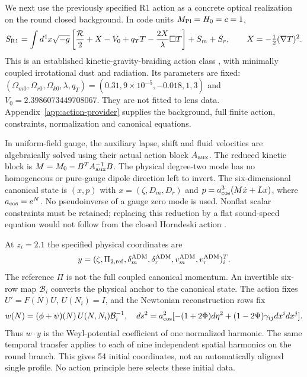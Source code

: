 \documentclass[11pt,a4paper]{article}
\begin{document}
We next use the previously specified R1 action as a concrete optical
realization on the round closed background. In code units
$M_{\rm Pl}=H_0=c=1$,
\begin{equation}
 S_{\rm R1}=\int d^4x\sqrt{-g}\left[
 \frac{\mathcal R}{2}+X-V_0+q_TT-\frac{2X}{\lambda}\Box T\right]+S_m+S_r,
 \qquad X=-\tfrac12(\nabla T)^2.
 \label{eq:r1}
\end{equation}
This is an established kinetic-gravity-braiding action class
\cite{Deffayet2010Braiding,Kobayashi2011Generalized}, with minimally
coupled irrotational dust and radiation. Its parameters are fixed:
$(\Omega_{m0},\Omega_{r0},\Omega_{k0},\lambda,q_T)
=(0.31,9\times10^{-5},-0.018,1,3)$ and
$V_0=2.3986073449708067$. They are not fitted to lens data.
Appendix~\ref{app:action-provider} supplies the background, full finite
action, constraints, normalization and canonical equations.

In uniform-field gauge, the auxiliary lapse, shift and fluid velocities
are algebraically solved using their actual action block $A_{\rm aux}$.
The reduced kinetic block is $M=M_0-B^TA_{\rm aux}^{-1}B$.
The physical degree-two mode has no homogeneous or pure-gauge dipole
direction left to invert. The six-dimensional canonical state is
$(x,p)$ with $x=(\zeta,D_m,D_r)$ and
$p=a_{\rm cos}^3(M\dot x+Lx)$, where $a_{\rm cos}=e^N$.
No pseudoinverse of a gauge zero mode is used. Nonflat scalar constraints
must be retained; replacing this reduction by a flat sound-speed equation
would not follow from the closed Horndeski action \cite{Akama2019Nonflat}.

At $z_i=2.1$ the specified physical coordinates are
\begin{equation}
 y=(\zeta,\Pi_{2,\rm ref},\delta_m^{\rm ADM},\delta_r^{\rm ADM},
 v_m^{\rm ADM},v_r^{\rm ADM})_i^T.
 \label{eq:anchor}
\end{equation}
The reference $\Pi$ is not the full coupled canonical momentum.
An invertible six-row map $\mathcal B_i$ converts the physical anchor
to the canonical state. The action fixes $U'=F(N)U$, $U(N_i)=I$,
and the Newtonian reconstruction rows fix
\begin{equation}
 w(N)=(\phi+\psi)(N)\,U(N,N_i)\mathcal B_i^{-1},\quad
 ds^2=a_{\rm cos}^2[-(1+2\Phi)d\eta^2+(1-2\Psi)\gamma_{ij}dx^idx^j].
 \label{eq:weyl}
\end{equation}
Thus $w\cdot y$ is the Weyl-potential coefficient of one normalized
harmonic. The same temporal transfer applies to each of nine independent
spatial harmonics on the round branch. This gives 54 initial coordinates,
not an automatically aligned single profile. No action principle here
selects these initial data.
\end{document}
